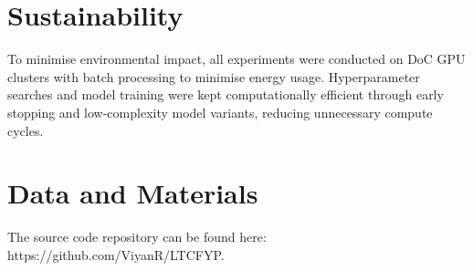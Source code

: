 \section*{Sustainability}

To minimise environmental impact, all experiments were conducted on DoC GPU clusters with batch processing to minimise energy usage. Hyperparameter searches and model training were kept computationally efficient through early stopping and low-complexity model variants, reducing unnecessary compute cycles.

\section*{Data and Materials}

The source code repository can be found here: https://github.com/ViyanR/LTCFYP.
